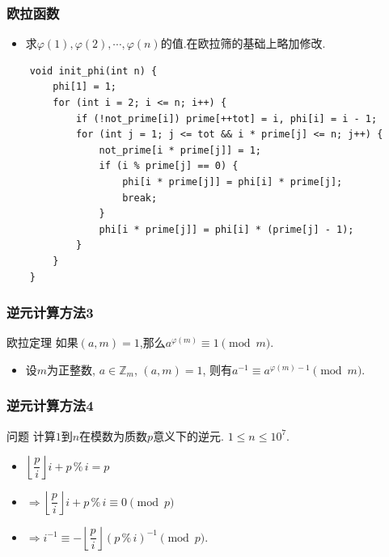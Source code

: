 \documentclass{beamer}
\newcommand{\pau}{}
\begin{document}
\begin{frame}[fragile]
    \frametitle{欧拉函数}
    \begin{itemize}
        \item 求$\varphi(1),\varphi(2),\cdots,\varphi(n)$的值.在欧拉筛的基础上略加修改.
    \end{itemize}\pau
    \begin{verbatim}
    void init_phi(int n) {
        phi[1] = 1;
        for (int i = 2; i <= n; i++) {
            if (!not_prime[i]) prime[++tot] = i, phi[i] = i - 1;
            for (int j = 1; j <= tot && i * prime[j] <= n; j++) {
                not_prime[i * prime[j]] = 1;
                if (i % prime[j] == 0) {
                    phi[i * prime[j]] = phi[i] * prime[j];
                    break;
                }
                phi[i * prime[j]] = phi[i] * (prime[j] - 1);
            }
        }
    }
    \end{verbatim}
\end{frame}

\begin{frame}[fragile]
    \frametitle{逆元计算方法3}
    \begin{block}{欧拉定理}
        如果$(a,m)=1$,那么$a^{\varphi(m)}\equiv1\pmod m$.
    \end{block} \pau
    \begin{itemize}
        \item 设$m$为正整数, $a\in\mathbb{Z}_m$, $(a,m)=1$, 则有$a^{-1}\equiv a^{\varphi(m)-1}\pmod m$.
    \end{itemize}
\end{frame}

\begin{frame}[fragile]
    \frametitle{逆元计算方法4}
    \begin{block}{问题}
        计算$1$到$n$在模数为质数$p$意义下的逆元. $1\leqslant n\leqslant10^7$.
    \end{block} \pau
    \begin{itemize}
        \item \quad$\left\lfloor\dfrac{p}{i}\right\rfloor i+p\,\%\,i=p$ \pau
        \item $\Rightarrow \left\lfloor\dfrac{p}{i}\right\rfloor i+p\,\%\,i\equiv0\pmod p$ \pau
        \item $\Rightarrow i^{-1}\equiv-\left\lfloor\dfrac{p}{i}\right\rfloor(p\,\%\,i)^{-1}\pmod p$.
    \end{itemize}
\end{frame}
\end{document}
